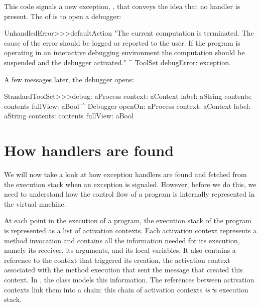 \documentclass[a4paper,10pt,twoside]{book}
\begin{document}
This code signals a new exception, , that conveys the idea that no handler is present. The  of  is to open a debugger:

\begin{code}{}
UnhandledError>>>defaultAction
	"The current computation is terminated. The cause of the error should be logged or reported to the user. If the program is operating in an interactive debugging environment the computation should be suspended and the debugger activated."
	^ ToolSet debugError: exception.
\end{code}

\noindent
A few messages later, the debugger opens:

\begin{code}{}
StandardToolSet>>>debug: aProcess context: aContext label: aString contents: contents fullView: aBool
	^ Debugger openOn: aProcess context: aContext label: aString contents: contents fullView: aBool
\end{code}

\section{How handlers are found}

We will now take a look at how exception handlers are found and fetched from the execution stack when an exception is signaled. 
However, before we do this, we need to understand how the control flow of a program is internally represented in the virtual machine.

At each point in the execution of a program, the execution stack of the program is represented as a list of activation contexts. Each activation context represents a method invocation and contains all the information needed for its execution, namely its receiver, its arguments, and its local variables. It also contains a reference to the context that triggered its creation, \ie the activation context associated with the method execution that sent the message that created this context. In \pharo, the class  models this information. 
The references between activation contexts link them into a chain: this chain of activation contexts \emph{is} \st's execution stack.
\end{document}
